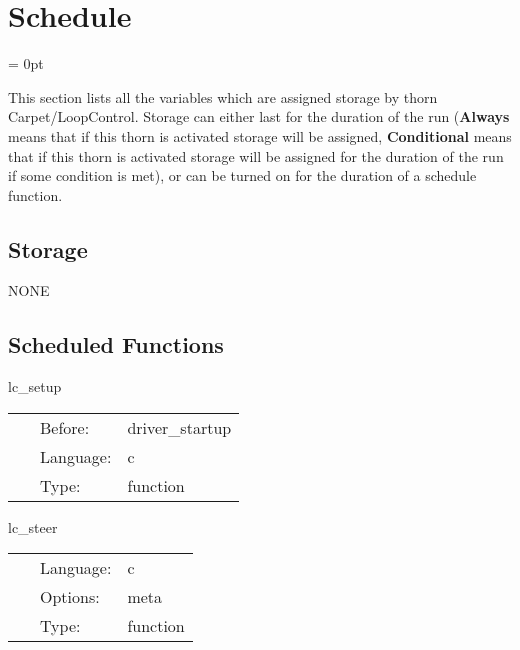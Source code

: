 
\section{Schedule} 


\parskip = 0pt


\noindent This section lists all the variables which are assigned storage by thorn Carpet/LoopControl.  Storage can either last for the duration of the run ({\bf Always} means that if this thorn is activated storage will be assigned, {\bf Conditional} means that if this thorn is activated storage will be assigned for the duration of the run if some condition is met), or can be turned on for the duration of a schedule function.


\subsection*{Storage}NONE
\subsection*{Scheduled Functions}
\vspace{5mm}


\hspace{5mm} lc\_setup 

\hspace{5mm}{\it set up loopcontrol } 


\hspace{5mm}

 \begin{tabular*}{160mm}{cll} 
~ & Before:  & driver\_startup \\ 
~ & Language:  & c \\ 
~ & Type:  & function \\ 
\end{tabular*} 


\vspace{5mm}


\hspace{5mm} lc\_steer 

\hspace{5mm}{\it update loopcontrol algorithm preferences } 


\hspace{5mm}

 \begin{tabular*}{160mm}{cll} 
~ & Language:  & c \\ 
~ & Options:  & meta \\ 
~ & Type:  & function \\ 
\end{tabular*} 


